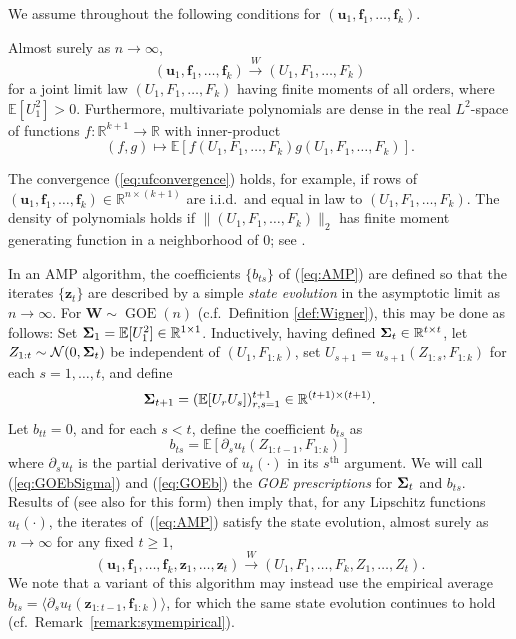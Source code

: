\documentclass[10pt,reqno]{amsart}
\def\u{\mathbf{u}}
\def\z{\mathbf{z}}
\def\f{\mathbf{f}}
\def\W{\mathbf{W}}
\def\E{\mathbb{E}}
\def\R{\mathbb{R}}
\def\Normal{\mathcal{N}}
\def\GOE{\operatorname{GOE}}
\def\toW{\overset{W}{\to}}
\begin{document}
We assume throughout the following conditions for $(\u_1,\f_1,\ldots,\f_k)$.

\begin{assumption}\label{assump:ufconvergence}
Almost surely as $n \to \infty$,
\begin{equation}\label{eq:ufconvergence}
(\u_1,\f_1,\ldots,\f_k) \toW (U_1,F_1,\ldots,F_k)
\end{equation}
for a joint limit law $(U_1,F_1,\ldots,F_k)$ having finite moments of all
orders, where $\E[U_1^2]>0$. Furthermore, multivariate polynomials are
dense in the real $L^2$-space of functions $f:\R^{k+1} \to \R$ with inner-product
\[(f,g) \mapsto \E[f(U_1,F_1,\ldots,F_k)g(U_1,F_1,\ldots,F_k)].\]
\end{assumption}

\begin{remark}
The convergence (\ref{eq:ufconvergence}) holds, for example,
if rows of $(\u_1,\f_1,\ldots,\f_k) \in \R^{n \times (k+1)}$ are i.i.d.\
and equal in law to $(U_1,F_1,\ldots,F_k)$.
The density of polynomials holds if $\|(U_1,F_1,\ldots,F_k)\|_2$ has
finite moment generating function in a neighborhood of 0; see
\cite[Section 14.1 and Corollary 14.24]{schmudgen2017moment}.
\end{remark}

In an AMP algorithm, the coefficients $\{b_{ts}\}$ of (\ref{eq:AMP}) are defined
so that the iterates $\{\z_t\}$ are described by a simple \emph{state evolution}
in the asymptotic limit as $n \to \infty$. 
For $\W \sim \GOE(n)$ (c.f.\ Definition \ref{def:Wigner}), this may be
done as follows: Set $\bSigma_1=\E[U_1^2] \in \R^{1 \times 1}$. Inductively,
having defined $\bSigma_t \in \R^{t \times t}$,
let $Z_{1:t} \sim \Normal(0,\bSigma_t)$ be
independent of $(U_1,F_{1:k})$, set
$U_{s+1}=u_{s+1}(Z_{1:s},F_{1:k})$ for each $s=1,\ldots,t$, and define
\begin{equation}\label{eq:GOEbSigma}
\bSigma_{t+1}=(\E[U_rU_s])_{r,s=1}^{t+1} \in \R^{(t+1) \times (t+1)}.
\end{equation}
Let $b_{tt} = 0$, and for each $s < t$, define the coefficient 
$b_{ts}$ as
\begin{equation}\label{eq:GOEb}
b_{ts}=\E[\partial_s u_t(Z_{1:t-1},F_{1:k})]
\end{equation}
where $\partial_s u_t$ is the partial derivative of $u_t(\cdot)$ in its
$s^\text{th}$ argument. We will call (\ref{eq:GOEbSigma}) and (\ref{eq:GOEb}) the
\emph{GOE prescriptions} for $\bm{\Sigma}_t$ and $b_{ts}$.
Results of \cite{bayati2011dynamics,javanmard2013state}
(see also \cite[Proposition 2.1]{montanari2021optimization} for this form)
then imply that, for any Lipschitz functions $u_t(\cdot)$,
the iterates of~(\ref{eq:AMP}) satisfy the state
evolution, almost surely as $n \to \infty$ for any fixed $t \geq 1$,
\[(\u_1,\f_1,\ldots,\f_k,\z_1,\ldots,\z_t) \toW
(U_1,F_1,\ldots,F_k,Z_1,\ldots,Z_t).\]
We note that a variant of this algorithm may instead use the empirical average
$b_{ts}=\langle \partial_s u_t(\z_{1:t-1},\f_{1:k}) \rangle$,
for which the same state evolution continues to hold
(cf.\ Remark~\ref{remark:symempirical}).
\end{document}
